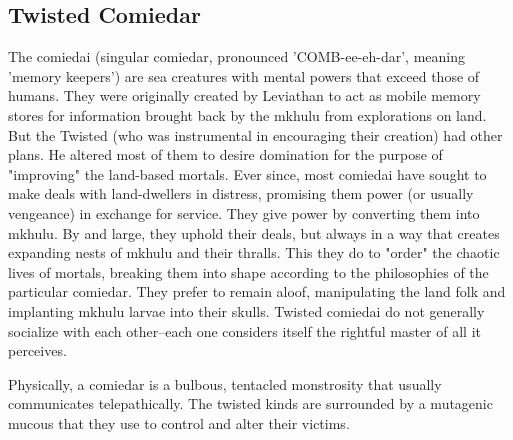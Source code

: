 \FloatBarrier
\subsection{Twisted Comiedar}
The comiedai (singular comiedar, pronounced 'COMB-ee-eh-dar', meaning 'memory keepers') are sea creatures with mental powers that exceed those of humans. They were originally created by Leviathan to act as mobile memory stores for information brought back by the mkhulu from explorations on land. But the Twisted (who was instrumental in encouraging their creation) had other plans. He altered most of them to desire domination for the purpose of "improving" the land-based mortals. Ever since, most comiedai have sought to make deals with land-dwellers in distress, promising them power (or usually vengeance) in exchange for service. They give power by converting them into mkhulu. By and large, they uphold their deals, but always in a way that creates expanding nests of mkhulu and their thralls. This they do to "order" the chaotic lives of mortals, breaking them into shape according to the philosophies of the particular comiedar. They prefer to remain aloof, manipulating the land folk and implanting mkhulu larvae into their skulls. Twisted comiedai do not generally socialize with each other--each one considers itself the rightful master of all it perceives.

Physically, a comiedar is a bulbous, tentacled monstrosity that usually communicates telepathically. The twisted kinds are surrounded by a mutagenic mucous that they use to control and alter their victims.

